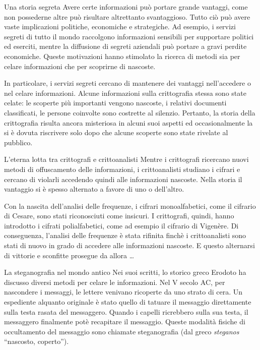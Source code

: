 \documentclass[final,hyperref={pdfpagelabels=false}]{beamer}
\begin{document}
\begin{frame}{}
    \begin{columns}[t]
    \begin{column}{.3\linewidth}
    \begin{block}{Una storia segreta}
      Avere certe informazioni può portare grande vantaggi, come non possederne altre può risultare altrettanto svantaggioso. Tutto ciò può avere vaste implicazioni politiche, economiche e strategiche. Ad esempio, i servizi segreti di tutto il mondo raccolgono informazioni sensibili per supportare politici ed eserciti, mentre la diffusione di segreti aziendali può portare a gravi perdite economiche. Queste motivazioni hanno stimolato la ricerca di metodi sia per celare informazioni che per scoprirne di nascoste. \par
      In particolare, i servizi segreti cercano di mantenere dei vantaggi nell'accedere o nel celare informazioni. Alcune informazioni sulla crittografia stessa sono state celate: le scoperte più importanti vengono nascoste, i relativi documenti classificati, le persone coinvolte sono costrette al silenzio. Pertanto, la storia della crittografia risulta ancora misteriosa in alcuni suoi aspetti ed occasionalmente la si è dovuta riscrivere solo dopo che alcune scoperte sono state rivelate al pubblico.
    \end{block}
      \begin{block}{L'eterna lotta tra crittografi e crittoanalisti}
        Mentre i crittografi ricercano nuovi metodi di offuscamento delle informazioni, i crittoanalisti studiano i cifrari e cercano di violarli accedendo quindi alle informazioni nascoste. Nella storia il vantaggio si è spesso alternato a favore di uno o dell'altro. \par 
        Con la nascita dell'analisi delle frequenze, i cifrari monoalfabetici, come il cifrario di Cesare, sono stati riconosciuti come insicuri. I crittografi, quindi, hanno introdotto i cifrati polialfabetici, come ad esempio il cifrario di Vigenère. Di conseguenza, l'analisi delle frequenze è stata rifinita finchè i crittoanalisti sono stati di nuovo in grado di accedere alle informazioni nascoste. E questo alternarsi di vittorie e sconfitte prosegue da allora \ldots
      \end{block}
        \begin{block}{La steganografia nel mondo antico}
          Nei suoi scritti, lo storico greco Erodoto ha discusso diversi metodi per celare le informazioni. Nel V secolo AC, per nascondere i messaggi, le lettere venivano ricoperte da uno strato di cera. Un espediente alquanto originale è stato quello di tatuare il messaggio direttamente sulla testa rasata del messaggero. Quando i capelli ricrebbero sulla sua testa, il messaggero finalmente potè recapitare il messaggio. Queste modalità fisiche di occultamento del messaggio sono chiamate steganografia (dal greco {\it steganos} ``nascosto, coperto'').

\end{block}
\end{column}
\end{columns}
\end{frame}
\end{document}
